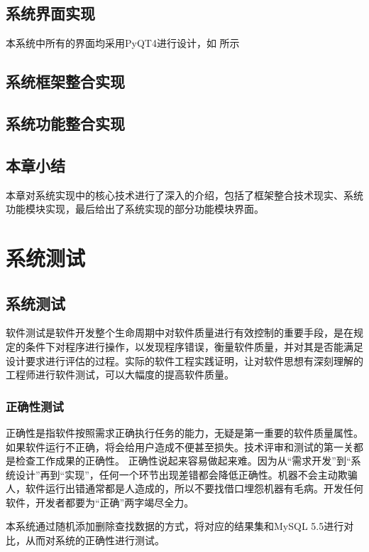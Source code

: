 \documentclass{zjutthesis}
\begin{document}
\section{系统界面实现}
本系统中所有的界面均采用PyQT4进行设计，如%
所示

\section{系统框架整合实现}

\section{系统功能整合实现}

\section{本章小结}
本章对系统实现中的核心技术进行了深入的介绍，包括了框架整合技术现实、系统功能模块实现，最后给出了系统实现的部分功能模块界面。


\chapter{系统测试}
\section{系统测试}
软件测试是软件开发整个生命周期中对软件质量进行有效控制的重要手段，是在规定的条件下对程序进行操作，以发现程序错误，衡量软件质量，并对其是否能满足设计要求进行评估的过程。实际的软件工程实践证明，让对软件思想有深刻理解的工程师进行软件测试，可以大幅度的提高软件质量。

\subsection{正确性测试}
正确性是指软件按照需求正确执行任务的能力，无疑是第一重要的软件质量属性。如果软件运行不正确，将会给用户造成不便甚至损失。技术评审和测试的第一关都是检查工作成果的正确性。
正确性说起来容易做起来难。因为从“需求开发”到“系统设计”再到“实现”，任何一个环节出现差错都会降低正确性。机器不会主动欺骗人，软件运行出错通常都是人造成的，所以不要找借口埋怨机器有毛病。开发任何软件，开发者都要为“正确”两字竭尽全力。

本系统通过随机添加删除查找数据的方式，将对应的结果集和MySQL 5.5进行对比，从而对系统的正确性进行测试。
\end{document}
